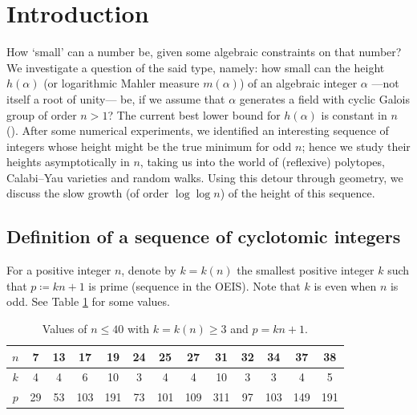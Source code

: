 \documentclass[12pt,reqno]{amsart}
\theoremstyle{definition}
\theoremstyle{plain}
\theoremstyle{definition}
\renewcommand{\geq}{\geqslant}
\renewcommand{\leq}{\leqslant}
\begin{document}
\maketitle


\section{Introduction}

How `small' can a number be, given some algebraic constraints on that number? We investigate a question of the said type, namely: how small can the height  $h(\alpha)$ (or logarithmic Mahler measure $m(\alpha)$) of an algebraic integer $\alpha$ ---not itself a root of unity--- be, if we assume that $\alpha$ generates a field with cyclic Galois group of order $n>1$? The current best lower bound for $h(\alpha)$ is constant in $n$ (\cite{AmorosoDvornicich,Schinzel}). After some numerical experiments, we identified an interesting sequence of integers whose height might be the true minimum for odd $n$; hence we study their heights asymptotically in $n$, taking us into the world of (reflexive) polytopes, Calabi--Yau varieties and random walks. Using this detour through geometry, we discuss the slow growth (of order  $\log \log n$) of the height of this sequence.
  
\subsection*{Definition of a sequence of cyclotomic integers} For a positive integer $n$, denote by $k =k(n)$ the smallest positive integer $k$ such that $p\coloneqq k n + 1$ is prime (sequence \cite[A034693]{oeis} in the OEIS). Note that $k$ is even when $n$ is odd. See Table \ref{table-k} for some values. 

\begin{table}[h]
\begin{center}
\begin{tabular}{ccccccccccccc}
\toprule
$n$  & 7 & 13 & 17 & 19 & 24 & 25 & 27 & 31 & 32 & 34 & 37 & 38 \\ \midrule
$k$ & 4 & 4 & 6 & 10 & 3 & 4 & 4 & 10 & 3 & 3 & 4 & 5 \\
$p$ & 29 & 53 & 103 & 191 & 73 & 101 & 109 & 311 &  97 & 103 & 149 & 191  \\ \bottomrule
\end{tabular}
\end{center} 
\caption{Values of $n\leq 40$ with $k=k(n) \geq 3$ and $p=kn+1$.}   
\label{table-k}  
\end{table}
\end{document}
